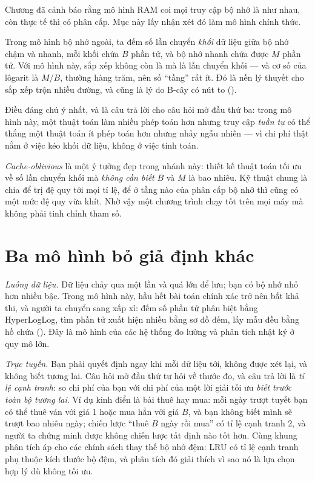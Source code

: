 \documentclass[../../algorithm.tex]{subfiles}
\begin{document}
Chương  đã cảnh báo rằng mô hình RAM coi mọi truy cập bộ nhớ là như nhau, còn thực tế thì có phân cấp. Mục này lấy nhận xét đó làm mô hình chính thức.

Trong mô hình bộ nhớ ngoài, ta đếm số lần chuyển \emph{khối} dữ liệu giữa bộ nhớ chậm và nhanh, mỗi khối chứa \(B\) phần tử, và bộ nhớ nhanh chứa được \(M\) phần tử. Với mô hình này, sắp xếp không còn là  mà là  lần chuyển khối --- và cơ số của lôgarit là \(M/B\), thường hàng trăm, nên số ``tầng'' rất ít. Đó là nền lý thuyết cho sắp xếp trộn nhiều đường, và cũng là lý do B-cây có nút to ().

Điều đáng chú ý nhất, và là câu trả lời cho câu hỏi mở đầu thứ ba: trong mô hình này, một thuật toán làm nhiều phép toán hơn nhưng truy cập \emph{tuần tự} có thể thắng một thuật toán ít phép toán hơn nhưng nhảy ngẫu nhiên --- vì chi phí thật nằm ở việc kéo khối dữ liệu, không ở việc tính toán.

\emph{Cache-oblivious} là một ý tưởng đẹp trong nhánh này\cite{frigo1999}: thiết kế thuật toán tối ưu về số lần chuyển khối mà \emph{không cần biết} \(B\) và \(M\) là bao nhiêu. Kỹ thuật chung là chia để trị đệ quy tới mọi tỉ lệ, để ở tầng nào của phân cấp bộ nhớ thì cũng có một mức đệ quy vừa khít. Nhờ vậy một chương trình chạy tốt trên mọi máy mà không phải tinh chỉnh tham số.

\section{Ba mô hình bỏ giả định khác}

\emph{Luồng dữ liệu.} Dữ liệu chảy qua một lần và quá lớn để lưu; bạn có bộ nhớ nhỏ hơn nhiều bậc. Trong mô hình này, hầu hết bài toán chính xác trở nên bất khả thi, và người ta chuyển sang xấp xỉ: đếm số phần tử phân biệt bằng HyperLogLog, tìm phần tử xuất hiện nhiều bằng sơ đồ đếm, lấy mẫu đều bằng hồ chứa (). Đây là mô hình của các hệ thống đo lường và phân tích nhật ký ở quy mô lớn.

\emph{Trực tuyến.} Bạn phải quyết định ngay khi mỗi dữ liệu tới, không được xét lại, và không biết tương lai. Câu hỏi mở đầu thứ tư hỏi về thước đo, và câu trả lời là \emph{tỉ lệ cạnh tranh}: so chi phí của bạn với chi phí của một lời giải tối ưu \emph{biết trước toàn bộ tương lai}. Ví dụ kinh điển là bài thuê hay mua: mỗi ngày trượt tuyết bạn có thể thuê ván với giá 1 hoặc mua hẳn với giá \(B\), và bạn không biết mình sẽ trượt bao nhiêu ngày; chiến lược ``thuê \(B\) ngày rồi mua'' có tỉ lệ cạnh tranh 2, và người ta chứng minh được không chiến lược tất định nào tốt hơn. Cùng khung phân tích áp cho các chính sách thay thế bộ nhớ đệm: LRU có tỉ lệ cạnh tranh phụ thuộc kích thước bộ đệm, và phân tích đó giải thích vì sao nó là lựa chọn hợp lý dù không tối ưu.
\end{document}
